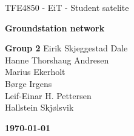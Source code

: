 \begin{titlepage}
\begin{center}

\vspace*{6cm}
{\Huge TFE4850 - EiT - Student satelite}

\vspace*{0.5cm}
{\LARGE\textbf{Groundstation network}}

\vspace*{0.7cm}
{\Large
	\textbf{Group 2}
	Eirik Skjeggestad Dale\\
	Hanne Thorshaug Andresen\\
	Marius Ekerholt\\
	Børge Irgens\\
	Leif-Einar H. Pettersen\\
	Hallstein Skjølsvik
}

{\vfill\textbf{\today}}

\end{center}
\end{titlepage}